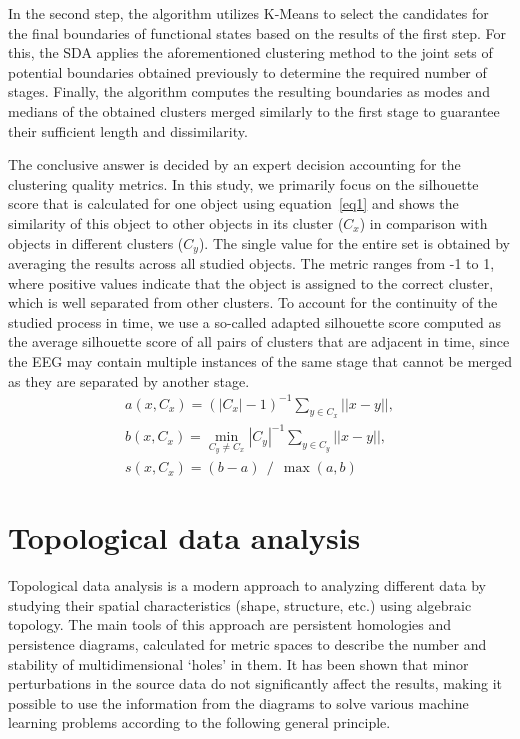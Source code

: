 \documentclass[journal,twoside,web]{ieeecolor2}
\begin{document}
In the second step, the algorithm utilizes K-Means to select the candidates for the final boundaries of functional states based on the results of the first step. For this, the SDA applies the aforementioned clustering method to the joint sets of potential boundaries obtained previously to determine the required number of stages. Finally, the algorithm computes the resulting boundaries as modes and medians of the obtained clusters merged similarly to the first stage to guarantee their sufficient length and dissimilarity.

The conclusive answer is decided by an expert decision accounting for the clustering quality metrics. In this study, we primarily focus on the silhouette score that is calculated for one object using equation~\eqref{eq1} and shows the similarity of this object to other objects in its cluster ($C_x$) in comparison with objects in different clusters ($C_y$). The single value for the entire set is obtained by averaging the results across all studied objects. The metric ranges from -1 to 1, where positive values indicate that the object is assigned to the correct cluster, which is well separated from other clusters. To account for the continuity of the studied process in time, we use a so-called adapted silhouette score computed as the average silhouette score of all pairs of clusters that are adjacent in time, since the EEG may contain multiple instances of the same stage that cannot be merged as they are separated by another stage.
\begin{align}
    a(x, C_x) = {(|C_x| - 1)} ^ {-1} \sum_{y \in C_x} ||x - y||, \nonumber\\
    b(x, C_x) = \min_{C_y \ne C_x} {|C_y|} ^ {-1} \sum_{y \in C_y} ||x - y||, \nonumber\\
    s(x, C_x) = (b - a)~~/~~\max(a, b) \label{eq1}
\end{align}

\section{Topological data analysis}

Topological data analysis is a modern approach to analyzing different data by studying their spatial characteristics (shape, structure, etc.) using algebraic topology. The main tools of this approach are persistent homologies and persistence diagrams, calculated for metric spaces to describe the number and stability of multidimensional `holes' in them. It has been shown that minor perturbations in the source data do not significantly affect the results, making it possible to use the information from the diagrams to solve various machine learning problems according to the following general principle.
\end{document}
